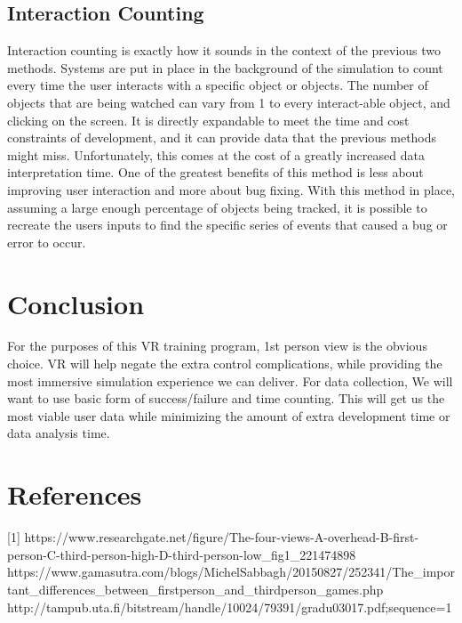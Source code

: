 \documentclass{article}
\begin{document}
\subsection{Interaction Counting}
Interaction counting is exactly how it sounds in the context of the previous two methods. Systems are put in place in the background of the simulation to count every time the user interacts with a specific object or objects. The number of objects that are being watched can vary from 1 to every interact-able object, and clicking on the screen. It is directly expandable to meet the time and cost constraints of development, and it can provide data that the previous methods might miss. Unfortunately, this comes at the cost of a greatly increased data interpretation time. One of the greatest benefits of this method is less about improving user interaction and more about bug fixing. With this method in place, assuming a large enough percentage of objects being tracked, it is possible to recreate the users inputs to find the specific series of events that caused a bug or error to occur. 


\section*{Conclusion}
For the purposes of this VR training program, 1st person view is the obvious choice. VR will help negate the extra control complications, while providing the most immersive simulation experience we can deliver. For data collection, We will want to use basic form of success/failure and time counting. This will get us the most viable user data while minimizing the amount of extra development time or data analysis time. 

\newpage
\section*{References}
[1] https://www.researchgate.net/figure/The-four-views-A-overhead-B-first-person-C-third-person-high-D-third-person-low\_fig1\_221474898
\break
[2]  https://www.gamasutra.com/blogs/MichelSabbagh/20150827/252341/The\_important\_differences\_between\_firstperson\_and\_thirdperson\_games.php
\break
[3]  http://tampub.uta.fi/bitstream/handle/10024/79391/gradu03017.pdf;sequence=1
\end{document}
